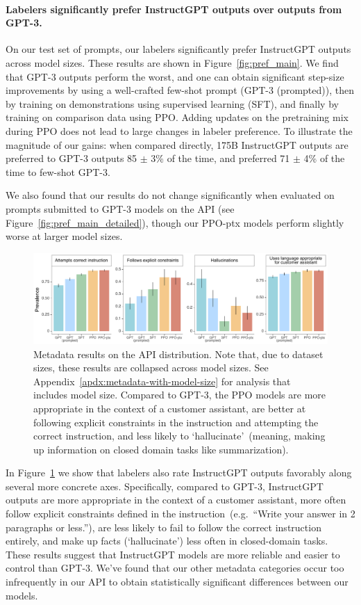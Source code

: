 \documentclass{article}
\begin{document}
\paragraph{Labelers significantly prefer InstructGPT outputs over outputs from GPT-3.} On our test set of prompts, our labelers significantly prefer InstructGPT outputs across model sizes. These results are shown in Figure~\ref{fig:pref_main}. We find that GPT-3 outputs perform the worst, and one can obtain significant step-size improvements by using a well-crafted few-shot prompt (GPT-3 (prompted)), then by training on demonstrations using supervised learning (SFT), and finally by training on comparison data using PPO. Adding updates on the pretraining mix during PPO does not lead to large changes in labeler preference. To illustrate the magnitude of our gains: when compared directly, 175B InstructGPT outputs are preferred to GPT-3 outputs 85 $\pm$ 3\% of the time, and preferred 71 $\pm$ 4\% of the time to few-shot GPT-3.

We also found that our results do not change significantly when evaluated on prompts submitted to GPT-3 models on the API (see Figure~\ref{fig:pref_main_detailed}), though our PPO-ptx models perform slightly worse at larger model sizes.


\begin{figure}
    \centering
    \includegraphics[width=\linewidth]{figs/metadata.pdf}
    \caption{Metadata results on the API distribution. Note that, due to dataset sizes, these results are collapsed across model sizes. See Appendix~\ref{apdx:metadata-with-model-size} for analysis that includes model size. Compared to GPT-3, the PPO models are more appropriate in the context of a customer assistant, are better at following explicit constraints in the instruction and attempting the correct instruction, and less likely to `hallucinate'~(meaning, making up information on closed domain tasks like summarization).}
    \label{fig:metadata_main}
\end{figure}


In Figure~\ref{fig:metadata_main} we show that labelers also rate InstructGPT outputs favorably along several more concrete axes. Specifically, compared to GPT-3, InstructGPT outputs are more appropriate in the context of a customer assistant, more often follow explicit constraints defined in the instruction~(e.g.\ ``Write your answer in 2 paragraphs or less.''), are less likely to fail to follow the correct instruction entirely, and make up facts (`hallucinate') less often in closed-domain tasks. 
These results suggest that InstructGPT models are more reliable and easier to control than GPT-3.
We've found that our other metadata categories occur too infrequently in our API to obtain statistically significant differences between our models. 
\end{document}
